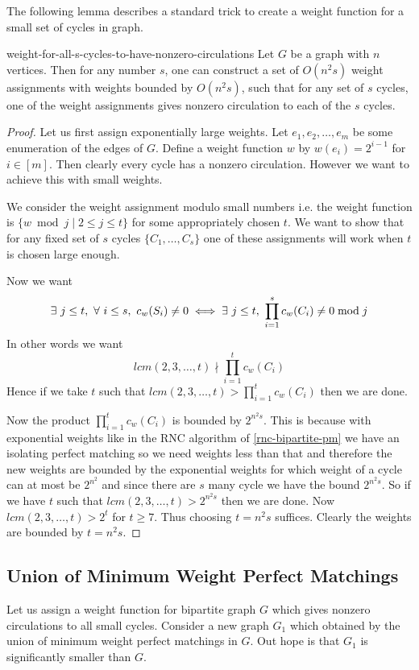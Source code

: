 The following lemma describes a standard trick to create a weight function for a small set of cycles in graph.
\begin{lemma}{\cite{ChariRohatgiSrinivasan_1993_Rou_CONF}}{weight-for-all-s-cycles-to-have-nonzero-circulations}
	Let $G$ be a graph with $n$ vertices. Then for any number $s$, one can construct a set of $O(n^2s)$ weight assignments with weights bounded by $O(n^2s)$, such that for any set of $s$ cycles, one of the weight assignments gives nonzero circulation to each of the $s$ cycles.
\end{lemma}
\begin{proof}
	Let us first assign exponentially large weights. Let $e_1, e_2,\dots , e_m$ be some enumeration of the edges of $G$. Define  a weight function $w$ by $w(e_i)=2^{i-1}$ for $i\in [m]$. Then clearly every cycle has a nonzero circulation. However we want to achieve this with small weights.

	We consider the weight assignment modulo small numbers i.e. the weight function is $\{w\bmod j\mid 2\leq j\leq t\}$ for some appropriately chosen $t$. We want to show that for any fixed set of $s$ cycles $\{C_1,\dots, C_s\}$ one of these assignments will work when $t$ is chosen large enough.

	Now we want $$\exs\ j\leq t,\ \forall\ i\leq s,\ c_w(S_i)\neq 0\iff \exs\ j\leq t,\ \prod_{i=1}^s c_w(C_i)\neq 0\bmod j$$In other words we want $$lcm(2,3,\dots, t)\nmid \prod_{i=1}^t c_w(C_i)$$Hence if we take $t$ such that $lcm(2,3,\dots, t)> \prod\limits_{i=1}^t c_w(C_i)$ then we are done.

	Now the product $\prod\limits_{i=1}^t c_w(C_i)$ is bounded by $2^{n^2s}$. This is because with exponential weights {like in the RNC algorithm} of \autoref{rnc-bipartite-pm} we have an isolating perfect matching so we need weights less than that and therefore the new weights are bounded by the exponential weights for which weight of a cycle can at most be $2^{n^2}$ and since there are $s$ many cycle we have the bound $2^{n^2s}$. So if we have $t$ such that $lcm(2,3,\dots, t)>2^{n^2s}$ then we are done. Now $lcm(2,3,\dots,t)>2^t$ for $t\geq 7$. Thus choosing $t=n^2s$ suffices. Clearly the weights are bounded by $t=n^2s$.
\end{proof}

\subsection{Union of Minimum Weight Perfect Matchings}
Let us assign a weight function for bipartite graph $G$ which gives nonzero circulations to all small cycles. Consider a new graph $G_1$ which obtained by the union of minimum weight perfect matchings in $G$. Out hope is that $G_1$ is significantly smaller than $G$.

